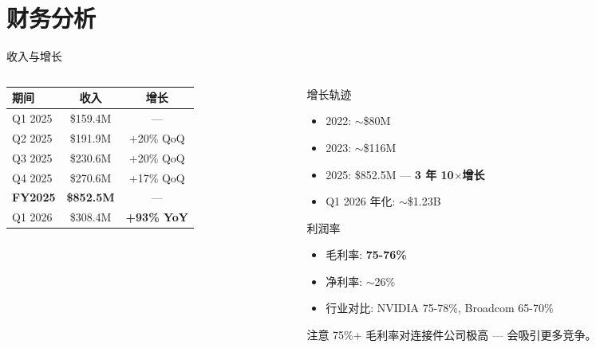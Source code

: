 \documentclass[aspectratio=169, 10pt, UTF8]{ctexbeamer}
\begin{document}
\section{财务分析}

\begin{frame}{收入与增长}
  \begin{columns}[T]
    \begin{column}{0.55\textwidth}
      \begin{table}[h]
        \centering
        \footnotesize
        \begin{tabular}{lcc}
          \toprule
          \textbf{期间} & \textbf{收入} & \textbf{增长} \\
          \midrule
          Q1 2025 & \$159.4M & — \\
          Q2 2025 & \$191.9M & +20\% QoQ \\
          Q3 2025 & \$230.6M & +20\% QoQ \\
          Q4 2025 & \$270.6M & +17\% QoQ \\
          \rowcolor{ieeeBlue!8}
          \textbf{FY2025} & \textbf{\$852.5M} & — \\
          Q1 2026 & \$308.4M & \textbf{+93\% YoY} \\
          \bottomrule
        \end{tabular}
      \end{table}
    \end{column}
    \begin{column}{0.45\textwidth}
      \begin{block}{增长轨迹}
        \begin{itemize}
          \item 2022: $\sim$\$80M
          \item 2023: $\sim$\$116M
          \item 2025: \$852.5M — \textbf{3 年 10$\times$增长}
          \item Q1 2026 年化: $\sim$\$1.23B
        \end{itemize}
      \end{block}

      \begin{exampleblock}{利润率}
        \begin{itemize}
          \item 毛利率: \textbf{75-76\%}
          \item 净利率: $\sim$26\%
          \item 行业对比: NVIDIA 75-78\%, Broadcom 65-70\%
        \end{itemize}
      \end{exampleblock}

      \begin{alertblock}{注意}
        75\%+ 毛利率对连接件公司极高 — 会吸引更多竞争。
      \end{alertblock}
    \end{column}
  \end{columns}
\end{frame}
\end{document}
